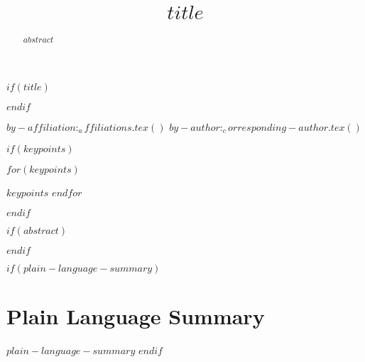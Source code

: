 $if(title)$
\title{$title$}
$endif$

$by-affiliation:_affiliations.tex()$
$by-author:_corresponding-author.tex()$

$if(keypoints)$
\begin{keypoints}
$for(keypoints)$\item $keypoints$ $endfor$
\end{keypoints}
$endif$

$if(abstract)$
\begin{abstract}
$abstract$
\end{abstract}
$endif$

$if(plain-language-summary)$
\section*{Plain Language Summary}
$plain-language-summary$
$endif$



